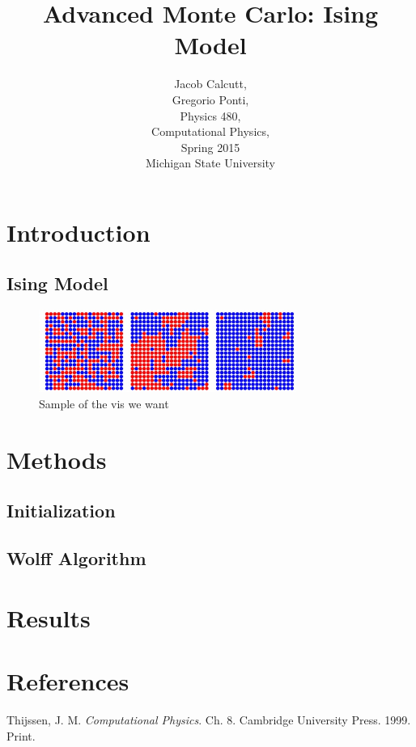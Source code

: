\documentclass[letterpaper,12pt]{article}
\numberwithin{equation}{subsection}
\begin{document}
\title{\textbf{Advanced Monte Carlo: Ising Model}}
\author{Jacob Calcutt,\\
	Gregorio Ponti,\\
	Physics 480, \\
	Computational Physics,\\
	Spring 2015\\
	Michigan State University}
\maketitle

\newpage
\tableofcontents

\newpage
\section{Introduction}

\subsection{Ising Model}
\begin{figure}[H]
        \centering
        \caption{Sample of the vis we want \label{fig:blah}}
                \centering
                \includegraphics[width=0.75\textwidth]{sample_lattice.png}
\end{figure}

\newpage
\section{Methods}
\subsection{Initialization}

\subsection{Wolff Algorithm}


\newpage
\section{Results}

\newpage
\thispagestyle{empty}
\mbox{}

\newpage
\section{References}
\begin{thebibliography}{99}
 Thijssen, J. M. \textit{Computational Physics}. Ch. 8. Cambridge University Press. 1999. Print.
\end{thebibliography}
\end{document}
